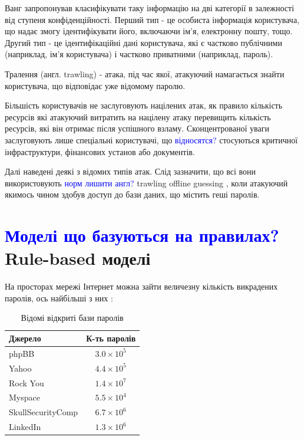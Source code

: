 Ванг \cite{Targeted online password guessing} запропонував класифікувати таку інформацію на дві категорії в залежності від ступеня конфіденційності. Перший тип - це особиста інформація користувача, що надає змогу ідентифікувати його, включаючи ім'я, електронну пошту, тощо. Другий тип - це ідентифікаційні дані користувача, які є частково публічними (наприклад, ім'я користувача) і частково приватними (наприклад, пароль).

\begin{definition}
Тралення (англ. trawling) - атака, під час якої, атакуючий намагається знайти користувача, що відповідає уже відомому паролю.
\end{definition}

\begin{remark}
Більшість користувачів не заслуговують націлених атак, як правило кількість ресурсів які атакуючий витратить на націлену атаку перевищить кількість ресурсів, які він отримає після успішного взламу. Сконцентрованої уваги заслуговують лише спеціальні користувачі, що \textcolor{blue}{відносятся?} стосуються критичної інфраструктури, фінансових установ або документів.
\end{remark}

Далі наведені деякі з відомих типів атак. Слід зазначити, що всі вони використовують \textcolor{blue}{норм лишити англ?} trawling offline guessing , коли атакуючий якимось чином здобув доступ до бази даних, що містить геші паролів.

\section{\textcolor{blue}{Моделі що базуються на правилах?} Rule-based моделі}
На просторах мережі Інтернет можна зайти величезну кількість викрадених паролів, ось найбільші з них \cite{GNPassGAN: Improved Generative Adversarial Networks For Trawling Offline Password Guessing}:

\begin{table}[h]
\centering
\begin{tabular}{|l|c|}
\hline
\textbf{Джерело} & \textbf{К-ть паролів} \\
\hline
phpBB & $3.0 \times 10^5$ \\
Yahoo & $4.4 \times 10^5$ \\
Rock You & $1.4 \times 10^7$ \\
Myspace & $5.5 \times 10^4$ \\
SkullSecurityComp & $6.7 \times 10^6$ \\
LinkedIn & $1.3 \times 10^6$ \\
\hline
\end{tabular}
\caption{Відомі відкриті бази паролів}
\end{table}

